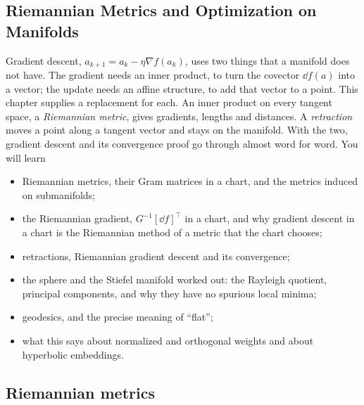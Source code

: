 \begin{notechapter}
\chapter{Riemannian Metrics and Optimization on Manifolds}
\label{ch:riemannian-optimization}

\begin{chapterintro}
Gradient descent, $a_{k+1} = a_k - \eta\nabla f(a_k)$, uses two things
that a manifold does not have. The gradient needs an inner product, to
turn the covector $\dd f(a)$ into a vector; the update needs an affine
structure, to add that vector to a point. This chapter supplies a
replacement for each. An inner product on every tangent space, a
\emph{Riemannian metric}, gives gradients, lengths and distances. A
\emph{retraction} moves a point along a tangent vector and stays on the
manifold. With the two, gradient descent and its convergence proof go
through almost word for word. You will learn
\begin{itemize}[nosep]
  \item Riemannian metrics, their Gram matrices in a chart, and the
        metrics induced on submanifolds;
  \item the Riemannian gradient, $G^{-1}[\dd f]^\top$ in a chart, and why
        gradient descent in a chart is the Riemannian method of a metric
        that the chart chooses;
  \item retractions, Riemannian gradient descent and its convergence;
  \item the sphere and the Stiefel manifold worked out: the Rayleigh
        quotient, principal components, and why they have no spurious
        local minima;
  \item geodesics, and the precise meaning of ``flat'';
  \item what this says about normalized and orthogonal weights and about
        hyperbolic embeddings.
\end{itemize}
\end{chapterintro}

\section{Riemannian metrics}\label{riemannian-optimization:sec:metric}


\end{notechapter}

